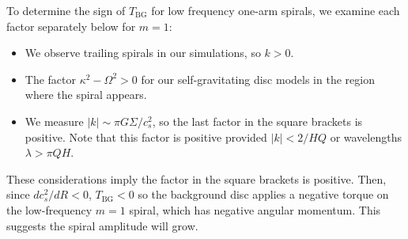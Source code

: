 To determine the sign of $T_\mathrm{BG}$ for low frequency one-arm spirals,
we examine each factor separately below for $m=1$:
\begin{itemize}
\item We observe trailing spirals in our simulations, so $k>0$. 
\item The factor $\kappa^2 - \Omega^2>0$ for our self-gravitating disc
  models in the region where the spiral appears. 
\item We measure $|k|\sim \pi G\Sigma/c_s^2$, so the last factor in
  the square brackets is positive. Note that this factor is positive
  provided $|k| < 2/HQ$ or wavelengths $\lambda > \pi Q H$.  
\end{itemize}
These considerations imply the factor in the square brackets is
positive. Then, since $dc_s^2/dR < 0$, $T_\mathrm{BG}<0$ so the background
disc applies a negative torque on the low-frequency $m=1$ spiral,
which has negative angular momentum. This suggests the spiral
amplitude will grow. 

